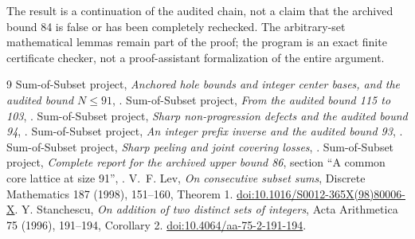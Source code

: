 \documentclass[11pt,a4paper]{article}
\begin{document}
The result is a continuation of the audited chain, not a claim that
the archived bound 84 is false or has been completely rechecked.
The arbitrary-set mathematical lemmas remain part of the proof;
the program is an exact finite certificate checker, not a proof-assistant
formalization of the entire argument.

\begingroup\small
\begin{thebibliography}{9}\setlength{\itemsep}{1pt}
 Sum-of-Subset project,
\emph{Anchored hole bounds and integer center bases, and the audited bound
$N\le91$}, .
 Sum-of-Subset project,
\emph{From the audited bound 115 to 103},
.
 Sum-of-Subset project,
\emph{Sharp non-progression defects and the audited bound 94},
.
 Sum-of-Subset project,
\emph{An integer prefix inverse and the audited bound 93},
.
 Sum-of-Subset project,
\emph{Sharp peeling and joint covering losses},
.
 Sum-of-Subset project,
\emph{Complete report for the archived upper bound 86}, section
``A common core lattice at size 91'',
.
 V.~F. Lev, \emph{On consecutive subset sums},
Discrete Mathematics 187 (1998), 151--160, Theorem 1.
\href{https://doi.org/10.1016/S0012-365X(98)80006-X}{doi:10.1016/S0012-365X(98)80006-X}.
 Y. Stanchescu,
\emph{On addition of two distinct sets of integers},
Acta Arithmetica 75 (1996), 191--194, Corollary 2.
\href{https://doi.org/10.4064/aa-75-2-191-194}{doi:10.4064/aa-75-2-191-194}.
\end{thebibliography}
\endgroup
\end{document}
